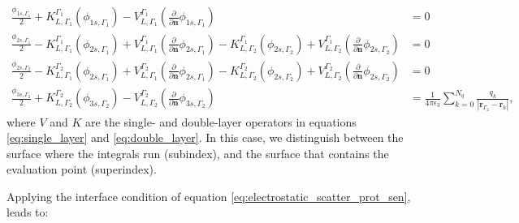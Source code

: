 \begin{widetext} %


\begin{align} \label{eq:integral_eq_lspr_nobc_system}
\frac{\phi_{1s,\Gamma_1}}{2}+ K_{L,\Gamma_1}^{\Gamma_1}(\phi_{1s,\Gamma_1}) - V_{L,\Gamma_1}^{\Gamma_1} \left(\frac{\partial}{\partial \mathbf{n}}\phi_{1s,\Gamma_1} \right) &= 0  \nonumber \\
\frac{\phi_{2s,\Gamma_1}}{2} - K_{L,\Gamma_1}^{\Gamma_1}(\phi_{2s,\Gamma_1}) + V_{L,\Gamma_1}^{\Gamma_1} \left(\frac{\partial}{\partial \mathbf{n}}\phi_{2s,\Gamma_1} \right) 
 - K_{L,\Gamma_2}^{\Gamma_1}(\phi_{2s,\Gamma_2}) + V_{L,\Gamma_2}^{\Gamma_1} \left(\frac{\partial}{\partial \mathbf{n}}\phi_{2s,\Gamma_2} \right) &= 0  \nonumber \\
\frac{\phi_{2s,\Gamma_2}}{2} - K_{L,\Gamma_1}^{\Gamma_2}(\phi_{2s,\Gamma_1}) + V_{L,\Gamma_1}^{\Gamma_2} \left(\frac{\partial}{\partial \mathbf{n}}\phi_{2s,\Gamma_1} \right)  
- K_{L,\Gamma_2}^{\Gamma_2}(\phi_{2s,\Gamma_2}) + V_{L,\Gamma_2}^{\Gamma_2} \left(\frac{\partial}{\partial \mathbf{n}}\phi_{2s,\Gamma_2} \right) &= 0  \nonumber \\
\frac{\phi_{3s,\Gamma_2}}{2} + K_{L,\Gamma_2}^{\Gamma_2}(\phi_{3s,\Gamma_2}) - V_{L,\Gamma_2}^{\Gamma_2} \left( \frac{\partial}{\partial \mathbf{n}} \phi_{3s,\Gamma_2} \right) &= \frac{1}{4\pi\epsilon_3} \sum_{k=0}^{N_q} \frac{q_k}{|\mathbf{r}_{\Gamma_2} - \mathbf{r}_k|} ,
\end{align}
%
\noindent where $V$ and $K$ are the single- and double-layer operators in equations 
\eqref{eq:single_layer} and \eqref{eq:double_layer}. In this case, we distinguish between the
surface where the integrals run (subindex), and the surface that contains the evaluation point (superindex).

Applying the interface condition of equation \eqref{eq:electrostatic_scatter_prot_sen},
leads to: 



\end{widetext}

